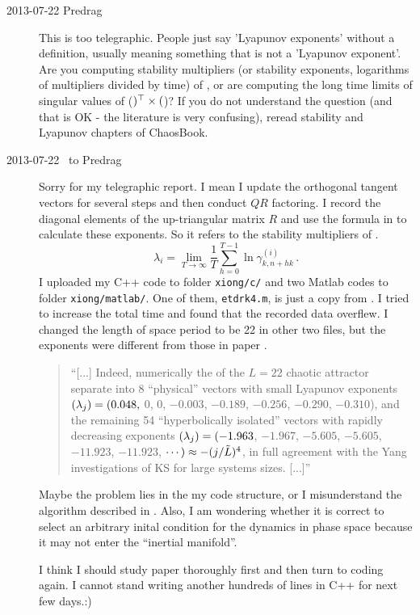 \begin{description}
\item[2013-07-22 Predrag] This is too telegraphic. People just say 'Lyapunov
exponents' without a definition, usually meaning something that is not
a 'Lyapunov exponent'. Are you computing
stability multipliers (or stability exponents, logarithms of multipliers
divided by
time) of \jacobianMs, or are computing the long time limits of
singular values of (\jacobianM${)}{}^\top\times($\jacobianM)?
If you do not understand the question (and that is OK - the literature is
very confusing), reread stability and Lyapunov
chapters of ChaosBook.

\item[2013-07-22 \XD\ to Predrag] Sorry for my telegraphic report. I mean I update
the orthogonal tangent vectors for several steps and then conduct $QR$ factoring.
I record the diagonal elements of the up-triangular matrix $R$ and use the formula
in  to calculate these exponents. So it refers to the stability multipliers
of \jacobianMs.
\[
 \lambda_i=\lim_{T\to \infty} \frac{1}{T} \sum_{h=0}^{T-1}
  \ln\gamma_{k,n+hk}^{(i)}
 \,.
\]
I uploaded my C++ code to folder \texttt{xiong/c/}
and two Matlab codes to folder \texttt{\texttt{xiong/matlab/}}.
One of them, \texttt{etdrk4.m}, is just a copy from . I tried to increase
the total time and found that the recorded data overflew. I changed the length of space period
to be 22 in other two files, but the exponents were different from those in paper .


\begin{quote}
``[...] Indeed, numerically the {\cLvs} of the $L=22$ chaotic attractor separate
into 8 ``physical'' vectors with small Lyapunov exponents
$(\lambda_j) = (0.048,$ 0, 0, $-0.003$, $-0.189$, $-0.256$,
$-0.290$, $-0.310$),
and the remaining 54 ``hyperbolically isolated'' vectors with rapidly
decreasing exponents
$(\lambda_j)
= (-1.963$,   $-1.967$,   $-5.605$,   $-5.605$,  $-11.923$,  $-11.923$,
 $\cdots) \approx -(j/\tilde{L})^4$,
in full agreement with the Yang \etal{} investigations
of KS for large systems sizes.
 [...]''
\end{quote}

Maybe the problem lies in the my code structure, or I misunderstand the algorithm described in
. Also, I am wondering whether it is correct to select an arbitrary inital
condition for the dynamics in phase space because it may not enter the ``inertial manifold''.

I think I should study paper  thoroughly first and then turn to coding again. I
cannot stand writing another hundreds of lines in C++ for next few days.:)


\end{description}
